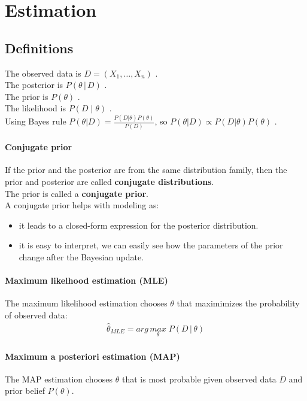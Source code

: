 \documentclass[../main.tex]{subfiles}
\begin{document}
\chapter{Estimation}
\section{Definitions}
The observed data is $D = (X_1, \dots, X_n)$ . \\
The posterior is $P(\theta\, | \, D)$ . \\
The prior is $P(\theta)$ . \\
The likelihood is $P(D\; |\; \theta)$ . \\
Using Bayes rule $P(\theta | D) = \frac{P(D|\theta)P(\theta)}{P(D)}$,
so $P(\theta | D) \propto P(D|\theta)P(\theta)$ .

\subsubsection{Conjugate prior}
If the prior and the posterior are from the same distribution family,
then the prior and posterior are called \textbf{conjugate distributions}. \\
The prior is called a \textbf{conjugate prior}. \\
A conjugate prior helps with modeling as:
\begin{itemize}
    \item it leads to a closed-form expression for the posterior distribution.
    \item it is easy to interpret, we can easily see how the parameters of the prior change after the Bayesian update.
\end{itemize}

\subsubsection{Maximum likelhood estimation (MLE)}
The maximum likelihood estimation chooses $\theta$ that maximimizes the probability of observed data:
\begin{align*}
    \hat{\theta}_{MLE} = arg\,\underset{\theta}{max}\; P(D\,|\, \theta)
\end{align*}

\subsubsection{Maximum a posteriori estimation (MAP)}
The MAP estimation chooses $\theta$ that is most probable given observed data $D$ and prior belief
$P(\theta)$. \\
\end{document}
